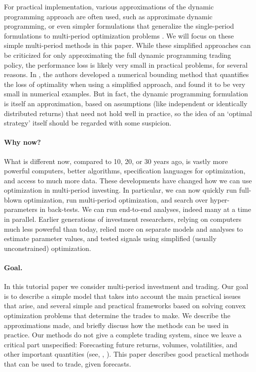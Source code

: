 \documentclass[openany]{article}  %
\begin{document}
For practical implementation, various approximations of the
dynamic programming approach are often used,
such as approximate dynamic programming,
or even simpler formulations that generalize the
single-period formulations to multi-period optimization problems
\cite{boyd2014performance}.
We will focus on these simple multi-period methods in this paper.
While these simplified approaches can be criticized for only
approximating the full dynamic programming trading policy,
the performance loss is likely very small in practical problems,
for several reasons.
In \cite{boyd2014performance}, the authors developed a numerical bounding
method that quantifies the loss of optimality when using a simplified
approach, and found it to be very small in numerical examples.
But in fact, the dynamic programming formulation is
itself an approximation, based on assumptions (like independent
or identically distributed returns) that need not hold well
in practice, so the idea of an `optimal strategy' itself
should be regarded with some suspicion.

\paragraph{Why now?}
What is different now, compared to 10, 20, or 30 years ago,
is vastly more powerful computers, better algorithms,
specification languages for optimization, and access to much more
data.
These developments have changed
how we can use optimization in multi-period investing.  In
particular, we can now quickly run full-blown optimization, run multi-period
optimization, and search over hyper-parameters in back-tests.  We can run
end-to-end analyses, indeed many at a time in parallel.
Earlier generations of investment researchers, relying on
computers much less powerful than today, relied more on separate models
and analyses to estimate parameter values, and tested signals using simplified
(usually unconstrained) optimization.

\paragraph{Goal.}
In this tutorial paper we consider multi-period investment and trading.
Our goal is to describe a simple model that takes into account
the main practical issues that arise,
and several simple and practical frameworks
based on solving convex optimization problems \cite{boyd2004convex} that determine
the trades to make.
We describe the approximations made, and briefly discuss how the methods
can be used in practice.
Our methods do not give a complete trading system,
since we leave a critical part unspecified:
Forecasting future returns, volumes, volatilities, and other important
quantities (see, \eg, \cite{grinold1999active}).
This paper describes good practical methods that can be used to trade, given forecasts.
\end{document}

